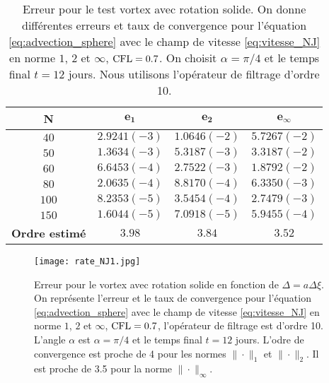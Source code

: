 \begin{table}[htbp]
\begin{center}
\begin{tabular}{|c||c|c|c|}
\hline
\textbf{N}  & $\mathbf{e_1}$ & $\mathbf{e_2}$ & $\mathbf{e_{\infty}}$\\
\hline
\hline
$40$  & $2.9241 (-3)$ & $1.0646 (-2)$ & $5.7267 (-2)$ \\
$50$  & $1.3634 (-3)$ & $5.3187 (-3)$ & $3.3187 (-2)$ \\
$60$  & $6.6453 (-4)$ & $2.7522 (-3)$ & $1.8792 (-2)$ \\
$80$  & $2.0635 (-4)$ & $8.8170 (-4)$ & $6.3350 (-3)$ \\
$100$ & $8.2353 (-5)$ & $3.5454 (-4)$ & $2.7479 (-3)$ \\
$150$ & $1.6044 (-5)$ & $7.0918 (-5)$ & $5.9455 (-4)$ \\
\hline 
\hline
\textbf{Ordre estimé}& $3.98$ & $3.84$ & $3.52$\\
\hline
\end{tabular}
\end{center}
\caption{Erreur pour le test vortex avec rotation solide. On donne différentes erreurs et taux de convergence pour l'équation \eqref{eq:advection_sphere} avec le champ de vitesse \eqref{eq:vitesse_NJ} en norme $1$, $2$ et $\infty$, $\text{CFL} = 0.7$. On choisit $\alpha = \pi/4$ et le temps final $t=12$ jours. Nous utilisons l'opérateur de filtrage d'ordre 10.}
\label{tab:rate1_NJ}
\end{table} 

\begin{figure}[htbp]
\begin{center}
\texttt{[image: rate\_NJ1.jpg]}
\end{center}
\caption{Erreur pour le vortex avec rotation solide en fonction de $\Delta = a \Delta \xi$. On représente l'erreur et le taux de convergence pour l'équation \eqref{eq:advection_sphere} avec le champ de vitesse \eqref{eq:vitesse_NJ} en norme $1$, $2$ et $\infty$, $\text{CFL} = 0.7$, l'opérateur de filtrage est d'ordre 10. L'angle $\alpha$ est $\alpha = \pi/4$ et le temps final $t=12$ jours. L'odre de convergence est proche de 4 pour les normes $\| \cdot \|_1$ et $\| \cdot \|_2$. Il est proche de 3.5 pour la norme $\| \cdot \|_{\infty}$.}
\label{fig:rate1_NJ}
\end{figure} 

